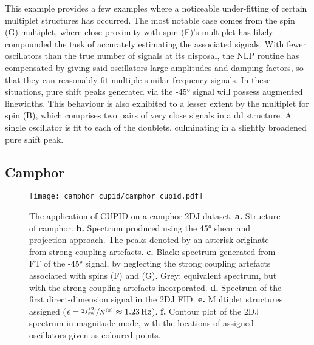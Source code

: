 This example provides a few examples where a noticeable under-fitting of
certain multiplet structures has occurred.
The most notable case comes from the spin (G) multiplet, where close proximity
with spin (F)'s multiplet has likely compounded the task of accurately
estimating the associated signals. With fewer oscillators than the true number
of signals at its disposal, the \ac{NLP} routine has compensated
by giving said oscillators large amplitudes and damping factors, so that they
can reasonably fit multiple similar-frequency signals. In these situations,
pure shift peaks generated via the \ang{-45} signal will possess augmented
linewidths.
This behaviour is also exhibited to a lesser extent by the multiplet for spin
(B), which comprises two pairs of very close signals in a dd structure. A
single oscillator is fit to each of the doublets, culminating in a slightly
broadened pure shift peak.


\subsection{Camphor}

\begin{figure}
    \texttt{[image: camphor\_cupid/camphor\_cupid.pdf]}%
    \caption[
    The application of \acs{CUPID} on a camphor \acs{2DJ} dataset.
    ]{
        The application of \acs{CUPID} on a camphor \ac{2DJ} dataset.
        \textbf{a.} Structure of camphor.
        \textbf{b.} Spectrum produced using the \ang{45} shear and projection
        approach. The peaks denoted by an asterisk originate from strong
        coupling artefacts.
        \textbf{c.} Black: spectrum generated from \ac{FT} of the \ang{-45}
        signal, by neglecting the strong coupling artefacts associated with
        spins (F) and (G).
        Grey: equivalent spectrum, but with the strong coupling artefacts
        incorporated.
        \textbf{d.} Spectrum of the first direct-dimension signal in the
        \ac{2DJ} \ac{FID}.
        \textbf{e.} Multiplet structures assigned ($\epsilon =
        \nicefrac{2\fswtwo}{\Ntwo} \approx \qty{1.23}{\hertz}$).
        \textbf{f.} Contour plot of the \ac{2DJ} spectrum in magnitude-mode,
        with the locations of assigned oscillators given as coloured points.
    }
    \label{fig:camphor-cupid}%
\end{figure}

